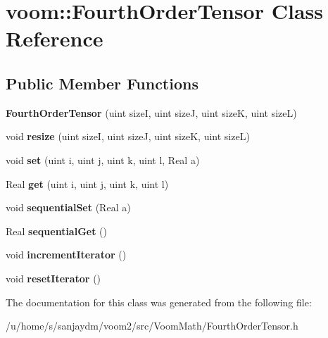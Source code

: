 \hypertarget{classvoom_1_1_fourth_order_tensor}{
\section{voom::FourthOrderTensor Class Reference}
\label{classvoom_1_1_fourth_order_tensor}
}
\subsection*{Public Member Functions}
\begin{DoxyCompactItemize}
\item 
\hypertarget{classvoom_1_1_fourth_order_tensor_ad110f2702da6eefaeb85f794fca3f147}{
{\bfseries FourthOrderTensor} (uint sizeI, uint sizeJ, uint sizeK, uint sizeL)}
\label{classvoom_1_1_fourth_order_tensor_ad110f2702da6eefaeb85f794fca3f147}

\item 
\hypertarget{classvoom_1_1_fourth_order_tensor_a9feabde2ff5701e34f3f25162fe9366a}{
void {\bfseries resize} (uint sizeI, uint sizeJ, uint sizeK, uint sizeL)}
\label{classvoom_1_1_fourth_order_tensor_a9feabde2ff5701e34f3f25162fe9366a}

\item 
\hypertarget{classvoom_1_1_fourth_order_tensor_a31b2d9eeb1f3f3307b4ab5b2f720dfcb}{
void {\bfseries set} (uint i, uint j, uint k, uint l, Real a)}
\label{classvoom_1_1_fourth_order_tensor_a31b2d9eeb1f3f3307b4ab5b2f720dfcb}

\item 
\hypertarget{classvoom_1_1_fourth_order_tensor_a3ce8292721cc43e45b9464445bcbe041}{
Real {\bfseries get} (uint i, uint j, uint k, uint l)}
\label{classvoom_1_1_fourth_order_tensor_a3ce8292721cc43e45b9464445bcbe041}

\item 
\hypertarget{classvoom_1_1_fourth_order_tensor_a66a3683d97f37127ada6606a848d0371}{
void {\bfseries sequentialSet} (Real a)}
\label{classvoom_1_1_fourth_order_tensor_a66a3683d97f37127ada6606a848d0371}

\item 
\hypertarget{classvoom_1_1_fourth_order_tensor_aa992156cd730df3a2d2a85924883b2e2}{
Real {\bfseries sequentialGet} ()}
\label{classvoom_1_1_fourth_order_tensor_aa992156cd730df3a2d2a85924883b2e2}

\item 
\hypertarget{classvoom_1_1_fourth_order_tensor_a6bc0e4decf22e3ce61738bc43d4fe64d}{
void {\bfseries incrementIterator} ()}
\label{classvoom_1_1_fourth_order_tensor_a6bc0e4decf22e3ce61738bc43d4fe64d}

\item 
\hypertarget{classvoom_1_1_fourth_order_tensor_ac9dbccb04a7c2ad963dd13a8090bea2b}{
void {\bfseries resetIterator} ()}
\label{classvoom_1_1_fourth_order_tensor_ac9dbccb04a7c2ad963dd13a8090bea2b}

\end{DoxyCompactItemize}


The documentation for this class was generated from the following file:\begin{DoxyCompactItemize}
\item 
/u/home/s/sanjaydm/voom2/src/VoomMath/FourthOrderTensor.h\end{DoxyCompactItemize}

